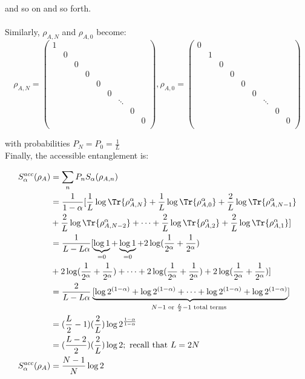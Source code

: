 and so on and so forth. \\
\\
Similarly, $\rho_{A,N}$ and $\rho_{A,0}$ become:
\begin{equation}
\rho_{A,N} = \begin{pmatrix} 
1 \\
& 0 \\
& & 0  \\
& & & 0 \\
& & & &  0 \\
& & & & & 0 \\
& & & & &  & \ddots \\
& & & & & & &  0 \\
& & & & & & & &  0 \\
\end{pmatrix} ,
\rho_{A,0} = \begin{pmatrix} 
0 \\
& 1 \\
& & 0  \\
& & & 0 \\
& & & &  0 \\
& & & & & 0 \\
& & & & &  & \ddots \\
& & & & & & &  0 \\
& & & & & & & &  0 \\
\end{pmatrix} 
\end{equation}

with probabilities $P_{N} = P_{0} = \frac{1}{L}$ \\

Finally, the accessible entanglement is:

\begin{align} 
S_{\alpha}^{acc}(\rho_A) &= \sum_{n} P_n S_{\alpha}(\rho_{A,n}) \nonumber \\
&= \frac{1}{1-\alpha}[\frac{1}{L} \log{\Tr{\rho_{A,N}^\alpha}} + \frac{1}{L} \log{\Tr{\rho_{A,0}^\alpha}} + \frac{2}{L} \log{\Tr{\rho_{A,N-1}^\alpha}} \nonumber \\
&+ \frac{2}{L} \log{\Tr{\rho_{A,N-2}^\alpha}} + \dots +\frac{2}{L} \log{\Tr{\rho_{A,2}^\alpha}} + \frac{2}{L} \log{\Tr{\rho_{A,1}^\alpha}} ] \nonumber \\
&= \frac{1}{L-L\alpha}[ \underbrace{\log{1}}_{=0} +  \underbrace{\log{1}}_{=0} + 2 \log({\frac{1}{2^\alpha}+\frac{1}{2^\alpha}}) \nonumber \\
&+ 2 \log({\frac{1}{2^\alpha}+\frac{1}{2^\alpha}})+ \dots + 2 \log({\frac{1}{2^\alpha}+\frac{1}{2^\alpha}}) + 2 \log({\frac{1}{2^\alpha}+\frac{1}{2^\alpha}}) ] \nonumber \\
&= \frac{2}{L-L\alpha}\underbrace{[\log{2^{(1-\alpha)}} + \log{2^{(1-\alpha)}} + \dots + \log{2^{(1-\alpha)}} + \log{2^{(1-\alpha)}}}_{N - 1 \text{ or } \frac{L}{2}-1\text{ total terms }}] \nonumber \\
&= (\frac{L}{2}-1)(\frac{2}{L})\log{2^\frac{1-\alpha}{1-\alpha}} \nonumber \\
&= (\frac{L-2}{2})(\frac{2}{L})\log{2} ; \text{ recall that } L = 2N \nonumber \\
S_{\alpha}^{acc}(\rho_A) &= \frac{N-1}{N}\log{2}
\end{align}

